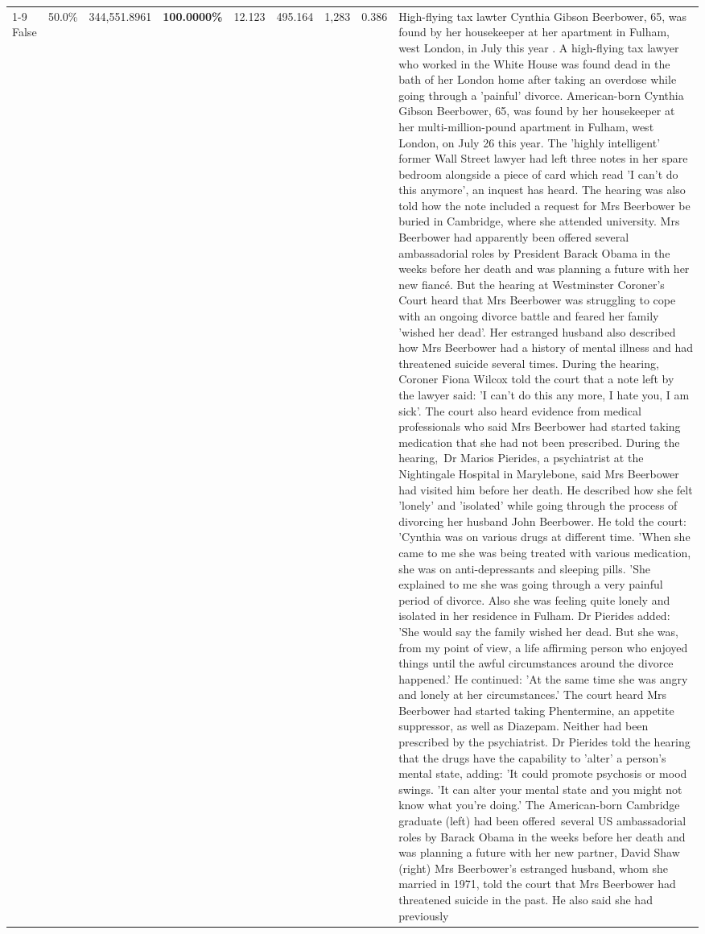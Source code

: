 \begin{table}[H]
\begin{tabular}{lllrlllll}
\cline{1-9}
False & 50.0\% & 344,551.8961 & \bfseries \color{red} 100.0000\% & 12.123 & 495.164 & 1,283 & 0.386 & High-flying tax lawter Cynthia Gibson Beerbower, 65, was found by her housekeeper at her apartment in Fulham, west London, in July this year . A high-flying tax lawyer who worked in the White House was found dead in the bath of her London home after taking an overdose while going through a 'painful' divorce. American-born Cynthia Gibson Beerbower, 65, was found by her housekeeper at her multi-million-pound apartment in Fulham, west London, on July 26 this year. The 'highly intelligent' former Wall Street lawyer had left three notes in her spare bedroom alongside a piece of card which read 'I can't do this anymore', an inquest has heard. The hearing was also told how the note included a request for Mrs Beerbower be buried in Cambridge, where she attended university. Mrs Beerbower had apparently been offered several ambassadorial roles by President Barack Obama in the weeks before her death and was planning a future with her new fiancé. But the hearing at Westminster Coroner's Court heard that Mrs Beerbower was struggling to cope with an ongoing divorce battle and feared her family 'wished her dead'. Her estranged husband also described how Mrs Beerbower had a history of mental illness and had threatened suicide several times. During the hearing, Coroner Fiona Wilcox told the court that a note left by the lawyer said: 'I can't do this any more, I hate you, I am sick'. The court also heard evidence from medical professionals who said Mrs Beerbower had started taking medication that she had not been prescribed. During the hearing, Dr Marios Pierides, a psychiatrist at the Nightingale Hospital in Marylebone, said Mrs Beerbower had visited him before her death. He described how she felt 'lonely' and 'isolated' while going through the process of divorcing her husband John Beerbower. He told the court: 'Cynthia was on various drugs at different time. 'When she came to me she was being treated with various medication, she was on anti-depressants and sleeping pills. 'She explained to me she was going through a very painful period of divorce. Also she was feeling quite lonely and isolated in her residence in Fulham. Dr Pierides added: 'She would say the family wished her dead. But she was, from my point of view, a life affirming person who enjoyed things until the awful circumstances around the divorce happened.' He continued: 'At the same time she was angry and lonely at her circumstances.' The court heard Mrs Beerbower had started taking Phentermine, an appetite suppressor, as well as Diazepam. Neither had been prescribed by the psychiatrist. Dr Pierides told the hearing that the drugs have the capability to 'alter' a person's mental state, adding: 'It could promote psychosis or mood swings. 'It can alter your mental state and you might not know what you're doing.' The American-born Cambridge graduate (left) had been offered several US ambassadorial roles by Barack Obama in the weeks before her death and was planning a future with her new partner, David Shaw (right) Mrs Beerbower's estranged husband, whom she married in 1971, told the court that Mrs Beerbower had threatened suicide in the past. He also said she had previously 
\end{tabular}
\end{table}
